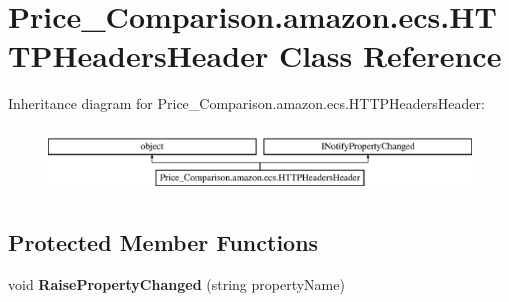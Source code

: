 \hypertarget{class_price___comparison_1_1amazon_1_1ecs_1_1_h_t_t_p_headers_header}{\section{Price\-\_\-\-Comparison.\-amazon.\-ecs.\-H\-T\-T\-P\-Headers\-Header Class Reference}
\label{class_price___comparison_1_1amazon_1_1ecs_1_1_h_t_t_p_headers_header}
}


 


Inheritance diagram for Price\-\_\-\-Comparison.\-amazon.\-ecs.\-H\-T\-T\-P\-Headers\-Header\-:\begin{figure}[H]
\begin{center}
\leavevmode
\includegraphics[height=1.750000cm]{class_price___comparison_1_1amazon_1_1ecs_1_1_h_t_t_p_headers_header}
\end{center}
\end{figure}
\subsection*{Protected Member Functions}
\begin{DoxyCompactItemize}
\item 
\hypertarget{class_price___comparison_1_1amazon_1_1ecs_1_1_h_t_t_p_headers_header_adfa4d24a40bfbad1bfc4f537105d1343}{void {\bfseries Raise\-Property\-Changed} (string property\-Name)}\label{class_price___comparison_1_1amazon_1_1ecs_1_1_h_t_t_p_headers_header_adfa4d24a40bfbad1bfc4f537105d1343}

\end{DoxyCompactItemize}
